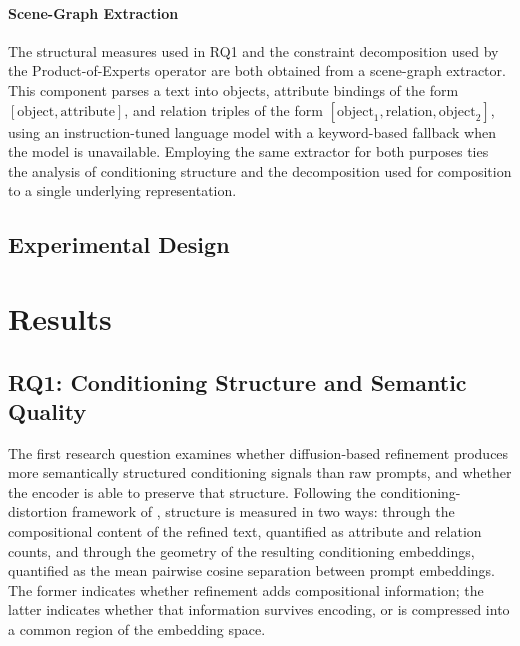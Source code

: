 \documentclass[a4paper,twoside,12pt]{report}
\begin{document}
\subsubsection{Scene-Graph Extraction}

The structural measures used in RQ1 and the constraint decomposition used by
the Product-of-Experts operator are both obtained from a scene-graph extractor.
This component parses a text into objects, attribute bindings of the form
\([\text{object},\text{attribute}]\), and relation triples of the form
\([\text{object}_1,\text{relation},\text{object}_2]\), using an
instruction-tuned language model with a keyword-based fallback when the model
is unavailable. Employing the same extractor for both purposes ties the
analysis of conditioning structure and the decomposition used for composition
to a single underlying representation.

\section{Experimental Design}
\label{sec:design}

\chapter{Results}
\label{ch:results}

\section{RQ1: Conditioning Structure and Semantic Quality}
\label{sec:rq1}

The first research question examines whether diffusion-based refinement produces
more semantically structured conditioning signals than raw prompts, and whether
the encoder is able to preserve that structure. Following the conditioning-
distortion framework of , structure is measured in two
ways: through the compositional content of the refined text, quantified as
attribute and relation counts, and through the geometry of the resulting
conditioning embeddings, quantified as the mean pairwise cosine separation
between prompt embeddings. The former indicates whether refinement adds
compositional information; the latter indicates whether that information
survives encoding, or is compressed into a common region of the embedding
space.
\end{document}
